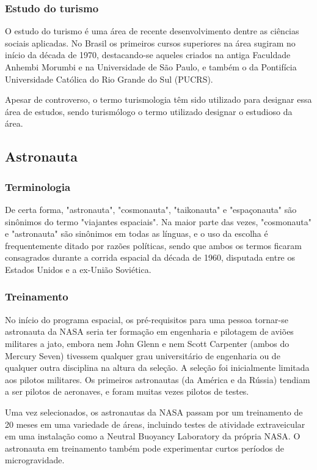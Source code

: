 \documentclass[a4paper,10pt]{article}
\begin{document}
\subsubsection{Estudo do turismo}
O estudo do turismo é uma área de recente desenvolvimento dentre as ciências sociais aplicadas. No Brasil os primeiros cursos superiores na área sugiram no início da década de 1970, destacando-se aqueles criados na antiga Faculdade Anhembi Morumbi e na Universidade de São Paulo, e também o da Pontifícia Universidade Católica do Rio Grande do Sul (PUCRS).

Apesar de controverso, o termo turismologia têm sido utilizado para designar essa área de estudos, sendo turismólogo o termo utilizado designar o estudioso da área.

\subsection{Astronauta}
\subsubsection{Terminologia}
De certa forma, "astronauta", "cosmonauta", "taikonauta" e "espaçonauta" são sinônimos do termo "viajantes espaciais". Na maior parte das vezes, "cosmonauta" e "astronauta" são sinônimos em todas as línguas, e o uso da escolha é frequentemente ditado por razões políticas, sendo que ambos os termos ficaram consagrados durante a corrida espacial da década de 1960, disputada entre os Estados Unidos e a ex-União Soviética.
\subsubsection{Treinamento}
No início do programa espacial, os pré-requisitos para uma pessoa tornar-se astronauta da NASA seria ter formação em engenharia e pilotagem de aviões militares a jato, embora nem John Glenn e nem Scott Carpenter (ambos do Mercury Seven) tivessem qualquer grau universitário de engenharia ou de qualquer outra disciplina na altura da seleção. A seleção foi inicialmente limitada aos pilotos militares. Os primeiros astronautas (da América e da Rússia) tendiam a ser pilotos de aeronaves, e foram muitas vezes pilotos de testes.

Uma vez selecionados, os astronautas da NASA passam por um treinamento de 20 meses em uma variedade de áreas, incluindo testes de atividade extraveicular em uma instalação como a Neutral Buoyancy Laboratory da própria NASA. O astronauta em treinamento também pode experimentar curtos períodos de microgravidade.
\end{document}
